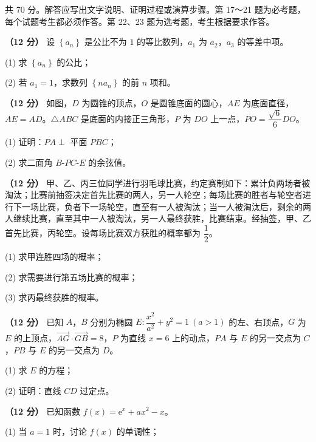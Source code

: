 \par\medskip


\begin{gktip}
共 70 分。解答应写出文字说明、证明过程或演算步骤。第 17～21 题为必考题，每个试题考生都必须作答。第 22、23 题为选考题，考生根据要求作答。
\end{gktip}


\textbf{（12 分）} 设 $\left\{a_n\right\}$ 是公比不为 $1$ 的等比数列，$a_1$ 为 $a_2$，$a_3$ 的等差中项。

  (1) 求 $\left\{a_n\right\}$ 的公比；

  (2) 若 $a_1=1$，求数列 $\left\{na_n\right\}$ 的前 $n$ 项和。

\textbf{（12 分）} 如图，$D$ 为圆锥的顶点，$O$ 是圆锥底面的圆心，$AE$ 为底面直径，$AE=AD$。$\triangle ABC$ 是底面的内接正三角形，$P$ 为 $DO$ 上一点，$PO=\dfrac{\sqrt6}6DO$。

\begin{center}\end{center}

  (1) 证明：$PA\perp$ 平面 $PBC$；

  (2) 求二面角 $B\text{-}PC\text{-}E$ 的余弦值。

\textbf{（12 分）} 甲、乙、丙三位同学进行羽毛球比赛，约定赛制如下：累计负两场者被淘汰；比赛前抽签决定首先比赛的两人，另一人轮空；每场比赛的胜者与轮空者进行下一场比赛，负者下一场轮空，直至有一人被淘汰；当一人被淘汰后，剩余的两人继续比赛，直至其中一人被淘汰，另一人最终获胜，比赛结束。经抽签，甲、乙首先比赛，丙轮空。设每场比赛双方获胜的概率都为 $\dfrac12$。

  (1) 求甲连胜四场的概率；

  (2) 求需要进行第五场比赛的概率；

  (3) 求丙最终获胜的概率。

\textbf{（12 分）} 已知 $A$，$B$ 分别为椭圆 $E:\dfrac{x^{2}}{a^{2}}+y^{2}=1\ (a>1)$ 的左、右顶点，$G$ 为 $E$ 的上顶点，$\overrightarrow{AG}\cdot\overrightarrow{GB}=8$，$P$ 为直线 $x=6$ 上的动点，$PA$ 与 $E$ 的另一交点为 $C$，$PB$ 与 $E$ 的另一交点为 $D$。

  (1) 求 $E$ 的方程；

  (2) 证明：直线 $CD$ 过定点。

\textbf{（12 分）} 已知函数 $f(x)=\mathrm e^{x}+ax^{2}-x$。

  (1) 当 $a=1$ 时，讨论 $f(x)$ 的单调性；

